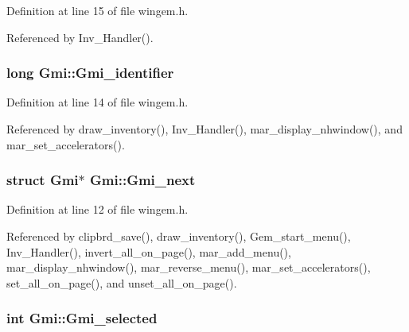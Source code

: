 Definition at line 15 of file wingem.\+h.



Referenced by Inv\+\_\+\+Handler().

\hypertarget{structGmi_a5519570e9de14161d2a277a72e8871b2}{
\subsubsection[{Gmi\+\_\+identifier}]{\setlength{\rightskip}{0pt plus 5cm}long Gmi\+::\+Gmi\+\_\+identifier}}\label{structGmi_a5519570e9de14161d2a277a72e8871b2}


Definition at line 14 of file wingem.\+h.



Referenced by draw\+\_\+inventory(), Inv\+\_\+\+Handler(), mar\+\_\+display\+\_\+nhwindow(), and mar\+\_\+set\+\_\+accelerators().

\hypertarget{structGmi_affa3a2ea15b9eafd09f47af267457215}{
\subsubsection[{Gmi\+\_\+next}]{\setlength{\rightskip}{0pt plus 5cm}struct {\bf Gmi}$\ast$ Gmi\+::\+Gmi\+\_\+next}}\label{structGmi_affa3a2ea15b9eafd09f47af267457215}


Definition at line 12 of file wingem.\+h.



Referenced by clipbrd\+\_\+save(), draw\+\_\+inventory(), Gem\+\_\+start\+\_\+menu(), Inv\+\_\+\+Handler(), invert\+\_\+all\+\_\+on\+\_\+page(), mar\+\_\+add\+\_\+menu(), mar\+\_\+display\+\_\+nhwindow(), mar\+\_\+reverse\+\_\+menu(), mar\+\_\+set\+\_\+accelerators(), set\+\_\+all\+\_\+on\+\_\+page(), and unset\+\_\+all\+\_\+on\+\_\+page().

\hypertarget{structGmi_a0c4ac4c267412c4d0a387a396ed019f0}{
\subsubsection[{Gmi\+\_\+selected}]{\setlength{\rightskip}{0pt plus 5cm}int Gmi\+::\+Gmi\+\_\+selected}}\label{structGmi_a0c4ac4c267412c4d0a387a396ed019f0}


